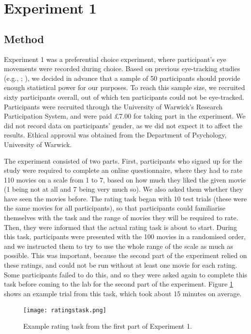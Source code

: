 \documentclass[11pt,a4paper]{article}
\begin{document}
\section{Experiment 1}

\subsection{Method} \label{chap1exp1method}

Experiment 1 was a preferential choice experiment, where participant's eye movements were recorded during choice. Based on previous eye-tracking studies (e.g., ; ), we decided in advance that a sample of 50 participants should provide enough statistical power for our purposes. To reach this sample size, we recruited sixty participants overall, out of which ten participants could not be eye-tracked. Participants were recruited through the University of Warwick's Research Participation System, and were paid £7.00 for taking part in the experiment. We did not record data on participants' gender, as we did not expect it to affect the results. Ethical approval was obtained from the Department of Psychology, University of Warwick.

The experiment consisted of two parts. First, participants who signed up for the study were required to complete an online questionnaire, where they had to rate 110 movies on a scale from 1 to 7, based on how much they liked the given movie (1 being not at all and 7 being very much so). We also asked them whether they have seen the movies before. The rating task began with 10 test trials (these were the same movies for all participants), so that participants could familiarise themselves with the task and the range of movies they will be required to rate. Then, they were informed that the actual rating task is about to start. During this task, participants were presented with the 100 movies in a randomised order, and we instructed them to try to use the whole range of the scale as much as possible. This was important, because the second part of the experiment relied on these ratings, and could not be run without at least one movie for each rating. Some participants failed to do this, and so they were asked again to complete this task before coming to the lab for the second part of the experiment. Figure \ref{fig:ratingstask} shows an example trial from this task, which took about 15 minutes on average. 

\begin{figure}[htb!]
\captionsetup{justification=centering}
\centering
\caption{Example rating task from the first part of Experiment 1. }
\texttt{[image: ratingstask.png]}
\label{fig:ratingstask}
\end{figure}
\end{document}
